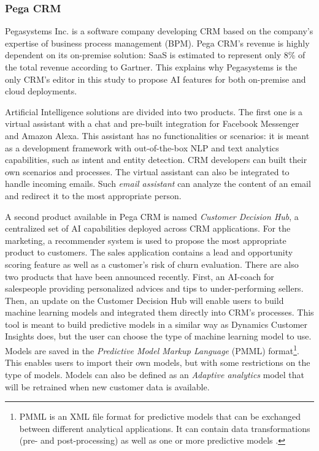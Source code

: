 \subsubsection*{Pega CRM}
Pegasystems Inc. is a software company developing CRM based on the company's expertise of business process management (BPM). Pega CRM's revenue is highly dependent on its on-premise solution: SaaS is estimated to represent only 8\% of the total revenue according to Gartner. This explains why Pegasystems is the only CRM's editor in this study to propose AI features for both on-premise and cloud deployments.

Artificial Intelligence solutions are divided into two products. The first one is a virtual assistant with a chat and pre-built integration for Facebook Messenger and Amazon Alexa. This assistant has no functionalities or scenarios: it is meant as a development framework with out-of-the-box NLP and text analytics capabilities, such as intent and entity detection. CRM developers can built their own scenarios and processes. The virtual assistant can also be integrated to handle incoming emails. Such \textit{email assistant} can analyze the content of an email and redirect it to the most appropriate person.

A second product available in Pega CRM is named \textit{Customer Decision Hub}, a centralized set of AI capabilities deployed across CRM applications. For the marketing, a recommender system is used to propose the most appropriate product to customers. The sales application contains a lead and opportunity scoring feature as well as a customer's risk of churn evaluation. There are also two products that have been announced recently. First, an AI-coach for salespeople providing personalized advices and tips to under-performing sellers. Then, an update on the Customer Decision Hub will enable users to build machine learning models and integrated them directly into CRM's processes. This tool is meant to build predictive models in a similar way as Dynamics Customer Insights does, but the user can choose the type of machine learning model to use. Models are saved in the \textit{Predictive Model Markup Language} (PMML) format\footnote{PMML is an XML file format for predictive models that can be exchanged between different analytical applications. It can contain data transformations (pre- and post-processing) as well as one or more predictive models \cite{pmml}.}. This enables users to import their own models, but with some restrictions on the type of models. Models can also be defined as an \textit{Adaptive analytics} model that will be retrained when new customer data is available.


